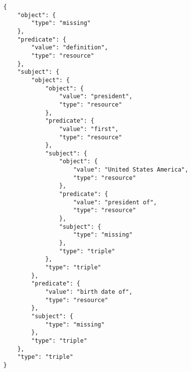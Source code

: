 \begin{verbatim}
{
    "object": {
        "type": "missing"
    }, 
    "predicate": {
        "value": "definition", 
        "type": "resource"
    }, 
    "subject": {
        "object": {
            "object": {
                "value": "president", 
                "type": "resource"
            }, 
            "predicate": {
                "value": "first", 
                "type": "resource"
            }, 
            "subject": {
                "object": {
                    "value": "United States America", 
                    "type": "resource"
                }, 
                "predicate": {
                    "value": "president of", 
                    "type": "resource"
                }, 
                "subject": {
                    "type": "missing"
                }, 
                "type": "triple"
            }, 
            "type": "triple"
        }, 
        "predicate": {
            "value": "birth date of", 
            "type": "resource"
        }, 
        "subject": {
            "type": "missing"
        }, 
        "type": "triple"
    }, 
    "type": "triple"
}
\end{verbatim}
